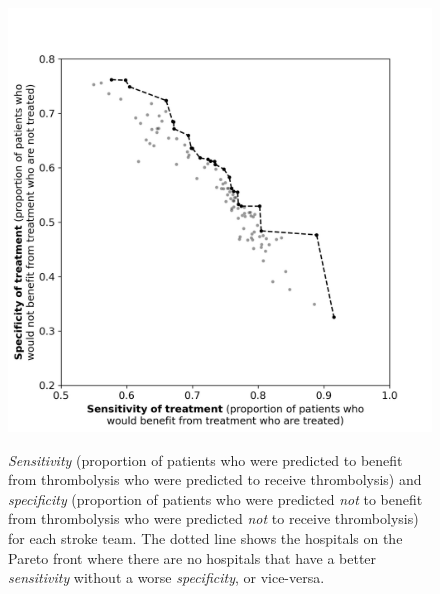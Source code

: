 \begin{figure}
    \centering
    {\includegraphics[width=0.65\linewidth]{./images/p4_spec_sens}} 
    \caption{\textit{Sensitivity} (proportion of patients who were predicted to benefit from thrombolysis who were predicted to receive thrombolysis) and \textit{specificity} (proportion of patients who were predicted \textit{not} to benefit from thrombolysis who were predicted \textit{not} to receive thrombolysis) for each stroke team. The dotted line shows the hospitals on the Pareto front where there are no hospitals that have a better \textit{sensitivity} without a worse \textit{specificity}, or vice-versa.}
    \label{fig:hosp_shap_scatter}
\end{figure}
